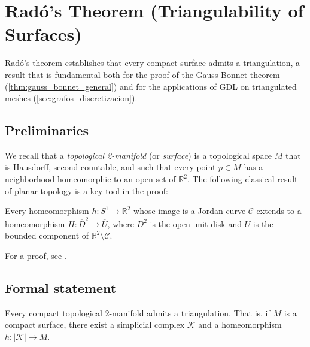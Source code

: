 \section{Radó's Theorem (Triangulability of Surfaces)}\label{sec:rado}

Radó's theorem establishes that every compact surface admits a triangulation, a result that is fundamental both for the proof of the Gauss-Bonnet theorem (\autoref{thm:gauss_bonnet_general}) and for the applications of \gls{GDL} on triangulated meshes (\autoref{sec:grafos_discretizacion}).

\subsection*{Preliminaries}

We recall that a \textit{topological 2-manifold} (or \textit{surface}) is a topological space $M$ that is Hausdorff, second countable, and such that every point $p \in M$ has a neighborhood homeomorphic to an open set of $\mathbb{R}^2$. The following classical result of planar topology is a key tool in the proof:

\begin{theorem}\label{thm:jordan_schoenflies}
Every homeomorphism $h: S^1 \to \mathbb{R}^2$ whose image is a Jordan curve $\mathcal{C}$ extends to a homeomorphism $H: \overline{D}^2 \to \overline{U}$, where $D^2$ is the open unit disk and $U$ is the bounded component of $\mathbb{R}^2 \setminus \mathcal{C}$.
\end{theorem}

For a proof, see \citet[Ch.~4]{moise1977geometric}.

\subsection*{Formal statement}

\begin{theorem}\label{thm:rado_apendice}
Every compact topological 2-manifold admits a triangulation. That is, if $M$ is a compact surface, there exist a simplicial complex $\mathcal{K}$ and a homeomorphism $h: |\mathcal{K}| \to M$.
\end{theorem}

